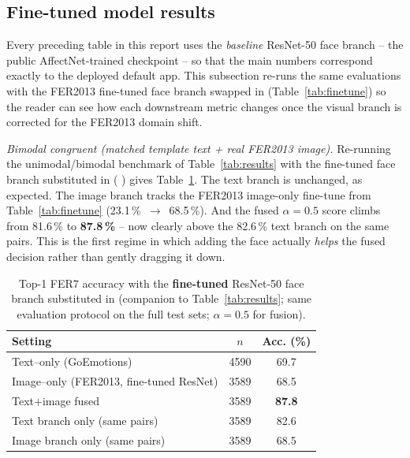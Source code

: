 \documentclass[sigconf,nonacm]{acmart}
\begin{document}
  \subsection{Fine-tuned model results}\label{sec:finetuned}
  Every preceding table in this report uses the \emph{baseline} ResNet-50 face branch -- the public AffectNet-trained  checkpoint -- so that the main numbers correspond exactly to the deployed default app. This subsection re-runs the same evaluations with the FER2013 fine-tuned face branch swapped in (Table~\ref{tab:finetune}) so the reader can see how each downstream metric changes once the visual branch is corrected for the FER2013 domain shift.

  \emph{Bimodal congruent (matched template text + real FER2013 image).} Re-running the unimodal/bimodal benchmark of Table~\ref{tab:results} with the fine-tuned face branch substituted in ( ) gives Table~\ref{tab:resultsft}. The text branch is unchanged, as expected. The image branch tracks the FER2013 image-only fine-tune from Table~\ref{tab:finetune} (23.1\,\%~$\to$~68.5\,\%). And the fused $\alpha\!=\!0.5$ score climbs from 81.6\,\% to \textbf{87.8\,\%} -- now clearly above the 82.6\,\% text branch on the same pairs. This is the first regime in which adding the face actually \emph{helps} the fused decision rather than gently dragging it down.

  \begin{table}[t]
    \centering
    \small
    \caption{Top-1 FER$7$ accuracy with the \textbf{fine-tuned} ResNet-50 face branch substituted in (companion to Table~\ref{tab:results}; same evaluation protocol on the full test sets; $\alpha\!=\!0.5$ for fusion).}
    \label{tab:resultsft}
    \begin{tabular}{@{}lcc@{}}
      \toprule
      \textbf{Setting} & \textbf{$n$} & \textbf{Acc. (\%)} \\
      \midrule
      Text--only (GoEmotions)                   & 4590 & 69.7 \\
      Image--only (FER2013, fine-tuned ResNet)  & 3589 & 68.5 \\
      Text$+$image fused                        & 3589 & \textbf{87.8} \\
      \midrule
      Text branch only (same pairs)             & 3589 & 82.6 \\
      Image branch only (same pairs)            & 3589 & 68.5 \\
      \bottomrule
    \end{tabular}
  \end{table}
\end{document}
